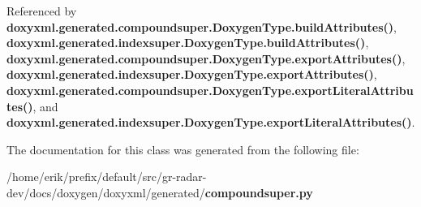 Referenced by {\bf doxyxml.\+generated.\+compoundsuper.\+Doxygen\+Type.\+build\+Attributes()}, {\bf doxyxml.\+generated.\+indexsuper.\+Doxygen\+Type.\+build\+Attributes()}, {\bf doxyxml.\+generated.\+compoundsuper.\+Doxygen\+Type.\+export\+Attributes()}, {\bf doxyxml.\+generated.\+indexsuper.\+Doxygen\+Type.\+export\+Attributes()}, {\bf doxyxml.\+generated.\+compoundsuper.\+Doxygen\+Type.\+export\+Literal\+Attributes()}, and {\bf doxyxml.\+generated.\+indexsuper.\+Doxygen\+Type.\+export\+Literal\+Attributes()}.



The documentation for this class was generated from the following file\+:\begin{DoxyCompactItemize}
\item 
/home/erik/prefix/default/src/gr-\/radar-\/dev/docs/doxygen/doxyxml/generated/{\bf compoundsuper.\+py}\end{DoxyCompactItemize}
